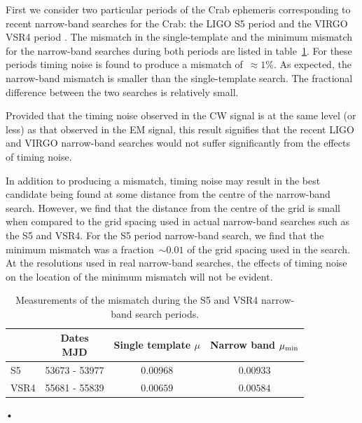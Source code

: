 \documentclass[../full_thesis/full_thesis.tex]{subfiles}
\begin{document}
First we consider two particular periods of the Crab ephemeris corresponding to
recent narrow-band searches for the Crab: the LIGO S5 period \citep{ligo2008}
and the VIRGO VSR4 period \citep{LIGO2015}. The mismatch in the single-template
and the minimum mismatch for the narrow-band searches during both periods are
listed in table~\ref{tab: Results}. For these periods timing noise is
found to produce a mismatch of~$\approx 1\%$. As expected, the narrow-band
mismatch is smaller than the single-template search. The fractional difference
between the two searches is relatively small. 

Provided that the timing noise observed in the CW signal is at the same level
(or less) as that observed in the EM signal, this result signifies that the
recent LIGO and VIRGO narrow-band searches would not suffer significantly
from the effects of timing noise.

In addition to producing a mismatch, timing noise may result in the best
candidate being found at some distance from the centre of the narrow-band
search.  However, we find that the distance from the centre of the grid is
small when compared to the grid spacing used in actual narrow-band searches
such as the S5 and VSR4.  For the S5 period narrow-band search, we find that
the minimum mismatch was a fraction~$\sim 0.01$ of the grid spacing used in the
\citet{ligo2008} search.  At the resolutions used in real narrow-band searches,
the effects of timing noise on the location of the minimum mismatch will not be
evident.

\begingroup
\small
\begin{table}[ht] 
\centering
\begin{tabular}{lccc} 
    & 
    \specialcell{Dates \\ MJD} & 
    \specialcell{Single  template \\ $\mu$} &
    \specialcell{Narrow band \\ $\mu_{\mathrm{min}}$} \\ \hline
S5 & 53673 - 53977 & $0.00968$ & $0.00933$ \\ 
VSR4 & 55681 - 55839 & $0.00659$ & $0.00584$ \\ 
\end{tabular}•
\caption{Measurements of the mismatch during the S5 and VSR4 narrow-band search
         periods.}
\label{tab: Results}
\end{table}
\endgroup
\end{document}
